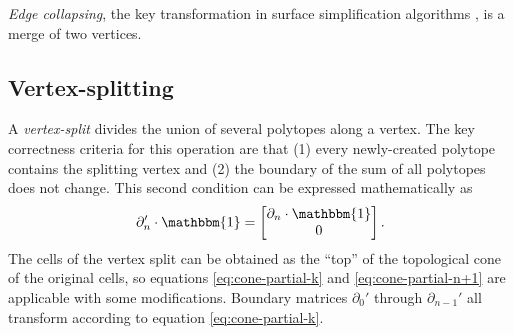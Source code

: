 \documentclass[twocolumn]{article}
\begin{document}
\emph{Edge collapsing}, the key transformation in surface simplification algorithms \cite{gueziec1995surface}, is a merge of two vertices.

\subsection{Vertex-splitting}

A \emph{vertex-split} divides the union of several polytopes along a vertex.
The key correctness criteria for this operation are that (1) every newly-created polytope contains the splitting vertex and (2) the boundary of the sum of all polytopes does not change.
This second condition can be expressed mathematically as
\begin{equation}
    \partial_n'\cdot\mathbbm{1} = \left[\begin{matrix}\partial_n\cdot\mathbbm{1} \\ 0\end{matrix}\right].
    \label{eq:split-preserves-boundaries}
\end{equation}
The cells of the vertex split can be obtained as the ``top'' of the topological cone of the original cells, so equations \eqref{eq:cone-partial-k} and \eqref{eq:cone-partial-n+1} are applicable with some modifications.
Boundary matrices $\partial_0'$ through $\partial_{n - 1}'$ all transform according to equation \eqref{eq:cone-partial-k}.
\end{document}
